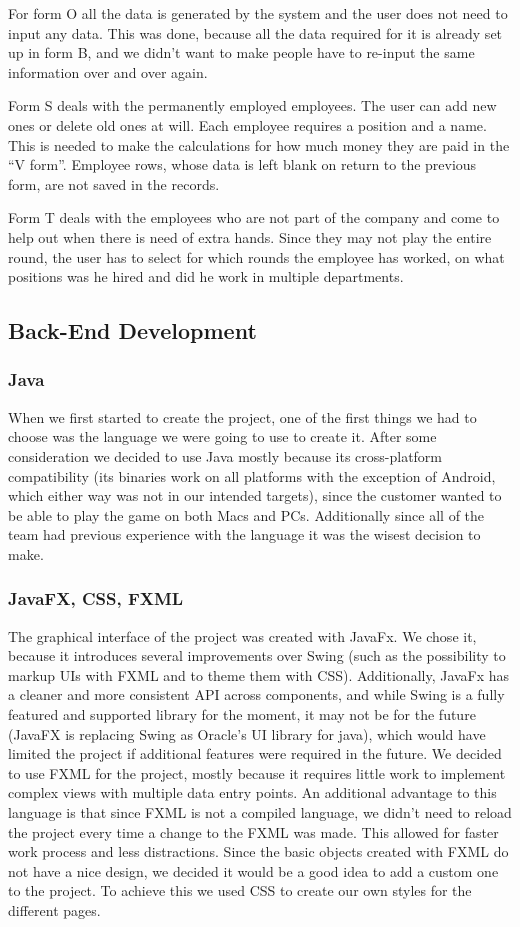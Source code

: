 \documentclass{l3proj}
\begin{document}
For form O all the data is generated by the system and the user does not need to input any data. This was done, because all the data required for it is already set up in form B, and we didn’t want to make people have to re-input the same information over and over again.

Form S deals with the permanently employed employees. The user can add new ones or delete old ones at will. Each employee requires a position and a name. This is needed to make the calculations for how much money they are paid in the “V form”. Employee rows, whose data is left blank on return to the previous form, are not saved in the records.

Form T deals with the employees who are not part of the company and come to help out when there is need of extra hands. Since they may not play the entire round, the user has to select for which rounds the employee has worked, on what positions was he hired and did he work in multiple departments.

\subsection{Back-End Development}
\subsubsection{Java}
When we first started to create the project, one of the first things we had to choose was the language we were going to use to create it. After some consideration we decided to use Java mostly because its cross-platform compatibility (its binaries work on all platforms with the exception of Android, which either way was not in our intended targets), since the customer wanted to be able to play the game on both Macs and PCs. Additionally since all of the team had previous experience with the language it was the wisest decision to make.


\subsubsection{JavaFX, CSS, FXML}
The graphical interface of the project was created with JavaFx. We chose it, because it introduces several improvements over Swing (such as the possibility to markup UIs with FXML and to theme them with CSS). Additionally, JavaFx has a cleaner and more consistent API across components, and while Swing is a fully featured and supported library for the moment, it may not be for the future (JavaFX is replacing Swing as Oracle’s UI library for java), which would have limited the project if additional features were required in the future.
We decided to use FXML for the project, mostly because it requires little work to implement complex views with multiple data entry points. An additional advantage to this language is that since FXML is not a compiled language, we didn’t need to reload the project every time a change to the FXML was made. This allowed for faster work process and less distractions. 
Since the basic objects created with FXML do not have a nice design, we decided it would be a good idea to add a custom one to the project. To achieve this we used CSS to create our own styles for the different pages.
\end{document}
